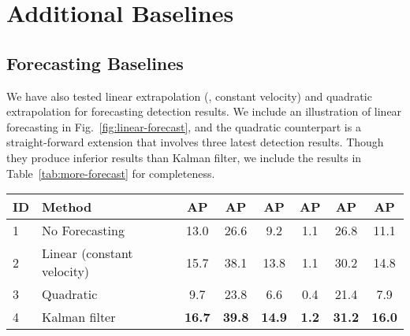 \section{Additional Baselines}
\label{app:addmethods}

\subsection{Forecasting Baselines}
\label{app:addforecasting}





We have also tested linear extrapolation (\ie, constant velocity) and quadratic extrapolation for forecasting detection results. We include an illustration of linear forecasting in Fig.~\ref{fig:linear-forecast}, and the quadratic counterpart is a straight-forward extension that involves three latest detection results. Though they produce inferior results than Kalman filter, we include the results in Table~\ref{tab:more-forecast} for completeness. 

\begin{table*}[]
\small
\centering
\caption{Comparison of different forecasting methods for streaming perception. We see that both linear and Kalman filter forecasting methods significantly improve the streaming performance. Kalman filter further outperforms the linear forecasting. The quadratic forecasting decreases the AP, suggesting that high-order extrapolation is not suitable for this task. The detection used here is Mask R-CNN ResNet 50 @ s0.5 with dynamic scheduling 
\ifstandalonesupplement
    (Alg. 1)
\else
    (Alg. \ref{alg:1})
\fi
}
\label{tab:more-forecast}
\addtolength{\tabcolsep}{0.22em}
\begin{tabular}{llcccccc}
\toprule
ID & Method                                             & AP            & AP         & AP        & AP        & AP        & AP       \\
\midrule
1 & No Forecasting & 13.0 & 26.6 & 9.2 & 1.1 & 26.8 & 11.1 \\
2 & Linear (constant velocity) & 15.7 & 38.1 & 13.8 & 1.1 & 30.2 & 14.8 \\
3 & Quadratic & 9.7 & 23.8 & 6.6 & 0.4 & 21.4 & 7.9 \\
4 & Kalman filter & \textbf{16.7} & \textbf{39.8} & \textbf{14.9} & \textbf{1.2} & \textbf{31.2} & \textbf{16.0}  \\
\bottomrule
\end{tabular}
\addtolength{\tabcolsep}{-0.2em}
\vspace{-2em}
\end{table*}


